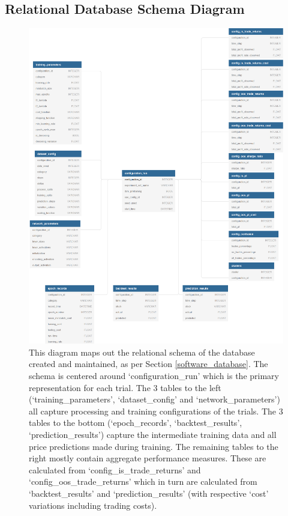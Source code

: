\documentclass[a4paper,11pt,oneside]{article}
\theoremstyle{plain}
\theoremstyle{definition}
\begin{document}
		
	\subsection{Relational Database Schema Diagram}\label{appendix_database_schema}
	
	\begin{figure}[H]
		\centering 
		\includegraphics[scale=0.55]{images/results/8_appendix/relational_schema.png}
		\caption[Relational Database Schema Diagram]{This diagram maps out the relational schema of the database created and maintained, as per Section \ref{software_database}. The schema is centered around `configuration\_run' which is the primary representation for each trial. The 3 tables to the left (`training\_parameters', `dataset\_config' and `network\_parameters') all capture processing and training configurations of the trials. The 3 tables to the bottom (`epoch\_records', `backtest\_results', `prediction\_results') capture the intermediate training data and all price predictions made during training. The remaining tables to the right mostly contain aggregate performance measures. These are calculated from `config\_is\_trade\_returns' and `config\_oos\_trade\_returns' which in turn are calculated from `backtest\_results' and `prediction\_results' (with respective `cost' variations including trading costs). }
		\label{figure-database_schema}
	\end{figure}
	
\end{document}

